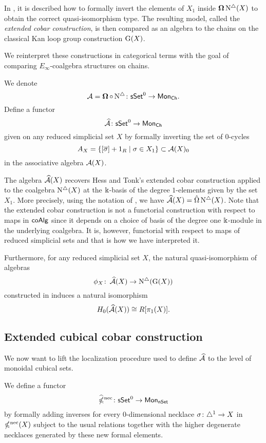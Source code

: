 In \cite{hess2010cobar}, it is described how to formally invert the elements of $X_1$ inside $\operatorname{\mathbf{\Omega}} \operatorname{N^{\triangle}}(X)$ to obtain the correct quasi-isomorphism type.
The resulting model, called the \textit{extended cobar construction}, is then compared as an algebra to the chains on the classical Kan loop group construction $\operatorname{G}(X)$.

We reinterpret these constructions in categorical terms with the goal of comparing $E_{\infty}$-coalgebra structures on chains. 

We denote
$$\operatorname{\mathcal{A}} = \operatorname{\mathbf{\Omega}} \circ \operatorname{N^{\triangle}} \colon \mathsf{sSet}^0 \to \mathsf{Mon}_{\mathsf{Ch}}.$$
Define a functor
\begin{equation*}
\operatorname{\mathcal{\widehat{A}}} \colon \mathsf{sSet}^0 \to \mathsf{Mon}_{\mathsf{Ch}}
\end{equation*}
given on any reduced simplicial set $X$ by formally inverting the set of $0$-cycles
\begin{equation*}
A_X = \{ [\overline{\sigma}]+1_R \mid \sigma \in X_1 \} \subset \operatorname{\mathcal{A}}(X)_0
\end{equation*}
in the associative algebra $\operatorname{\mathcal{A}}(X)$.

The algebra $\operatorname{\mathcal{\widehat{A}}}(X)$ recovers Hess and Tonk's extended cobar construction applied to the coalgebra $\operatorname{N^{\triangle}}(X)$ at the $\Bbbk$-basis of the degree $1$-elements given by the set $X_1$. More precisely, using the notation of \cite{hess2010cobar}, we have $\operatorname{\mathcal{\widehat{A}}}(X)= \hat{\Omega}\operatorname{N^{\triangle}}(X)$. Note that the extended cobar construction is not a functorial construction with respect to maps in $\mathsf{coAlg}$ since it depends on a choice of basis of the degree one $\Bbbk$-module in the underlying coalgebra. It is, however, functorial with respect to maps of reduced simplicial sets and that is how we have interpreted it. 

Furthermore, for any reduced simplicial set $X$, the natural quasi-isomorphism of algebras 
\[\phi_X \colon \operatorname{\mathcal{\widehat{A}}}(X) \to \operatorname{N^{\triangle}}(\operatorname{G}(X)) \] 
constructed in \cite{hess2010cobar} induces a natural isomorphism
\begin{equation*}
H_0(\operatorname{\mathcal{\widehat{A}}}(X)) \cong R[\pi_1(X)].
\end{equation*}


\subsection{Extended cubical cobar construction}
We now want to lift the localization procedure used to define $\operatorname{\mathcal{\widehat{A}}}$ to the level of monoidal cubical sets.

We define a functor
\begin{equation*}
\operatorname{\widehat{\mathbb{\Omega}}^{\mathrm{nec}}} \colon \mathsf{sSet}^0 \to \mathsf{Mon}_{\mathsf{nSet}}
\end{equation*}
by formally adding inverses for every $0$-dimensional necklace $\sigma \colon \triangle^1 \to X$ in $\operatorname{\mathbb{\Omega}^{\mathrm{nec}}}(X)$ subject to the usual relations together with the higher degenerate necklaces generated by these new formal elements. 

